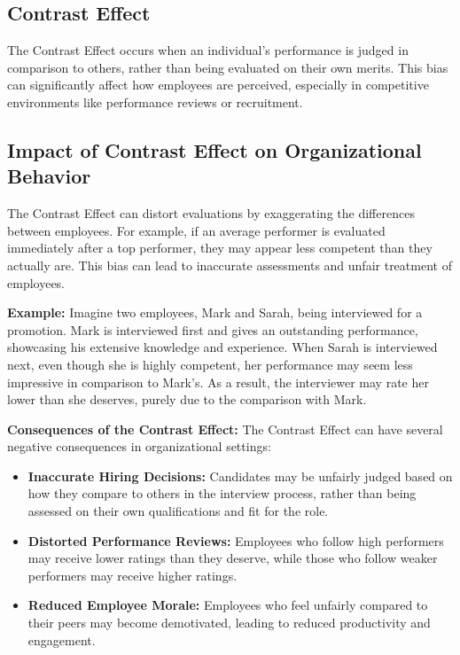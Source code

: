 \documentclass{article}
\begin{document}
\subsection*{Contrast Effect}
The Contrast Effect occurs when an individual’s performance is judged in comparison to others, rather than being evaluated on their own merits. This bias can significantly affect how employees are perceived, especially in competitive environments like performance reviews or recruitment.

\subsection*{Impact of Contrast Effect on Organizational Behavior}
The Contrast Effect can distort evaluations by exaggerating the differences between employees. For example, if an average performer is evaluated immediately after a top performer, they may appear less competent than they actually are. This bias can lead to inaccurate assessments and unfair treatment of employees.

\textbf{Example:}  
Imagine two employees, Mark and Sarah, being interviewed for a promotion. Mark is interviewed first and gives an outstanding performance, showcasing his extensive knowledge and experience. When Sarah is interviewed next, even though she is highly competent, her performance may seem less impressive in comparison to Mark’s. As a result, the interviewer may rate her lower than she deserves, purely due to the comparison with Mark.

\textbf{Consequences of the Contrast Effect:}  
The Contrast Effect can have several negative consequences in organizational settings:

\begin{itemize}
    \item \textbf{Inaccurate Hiring Decisions:} Candidates may be unfairly judged based on how they compare to others in the interview process, rather than being assessed on their own qualifications and fit for the role.
    \item \textbf{Distorted Performance Reviews:} Employees who follow high performers may receive lower ratings than they deserve, while those who follow weaker performers may receive higher ratings.
    \item \textbf{Reduced Employee Morale:} Employees who feel unfairly compared to their peers may become demotivated, leading to reduced productivity and engagement.
\end{itemize}
\end{document}
